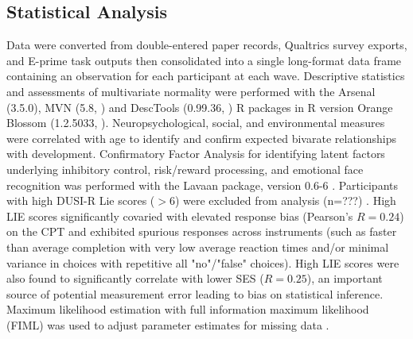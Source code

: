 \documentclass[utf8]{frontiersSCNS} %
\begin{document}
\subsection{Statistical Analysis} Data were converted from double-entered paper records, Qualtrics survey exports, and E-prime task outputs then consolidated into a single long-format data frame containing an observation for each participant at each wave. Descriptive statistics and assessments of multivariate normality were performed with the Arsenal (3.5.0), MVN (5.8, \cite{MVN}) and DescTools (0.99.36, \cite{DescTools}) R packages in R version Orange Blossom (1.2.5033, \cite{R}). Neuropsychological, social, and environmental measures were correlated with age to identify and confirm expected bivarate relationships with development. Confirmatory Factor Analysis for identifying latent factors underlying inhibitory control, risk/reward processing, and emotional face recognition was performed with the Lavaan package, version 0.6-6 \citep{Lavaan}. Participants with high DUSI-R Lie scores ($>6$) were excluded from analysis (n=???) \citep{dalla2003effects}. High LIE scores significantly covaried with elevated response bias (Pearson's $R=0.24$) on the CPT and exhibited spurious responses across instruments (such as faster than average completion with very low average reaction times and/or minimal variance in choices with repetitive all "no"/"false" choices). High LIE scores were also found to significantly correlate with lower SES ($R=0.25$), an important source of potential measurement error leading to bias on statistical inference.  Maximum likelihood estimation with full information maximum likelihood (FIML) was used to adjust parameter estimates for missing data \citep{cham2017full}. 
\end{document}
